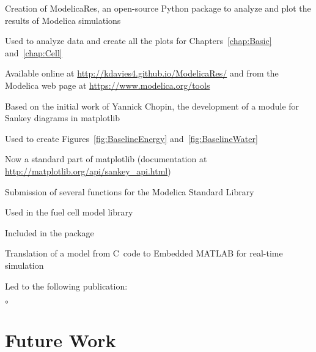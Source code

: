 \begin{itemize*}

  \item Creation of ModelicaRes, an open-source Python package to analyze and plot the results of Modelica simulations
    \begin{itemize*}
      \item Used to analyze data and create all the plots for Chapters~\ref{chap:Basic} and~\ref{chap:Cell}
      \item Available online at \url{http://kdavies4.github.io/ModelicaRes/} and from the Modelica web page at \url{https://www.modelica.org/tools}
    \end{itemize*}

  \item Based on the initial work of Yannick Chopin, the development of a module for Sankey diagrams in matplotlib
    \begin{itemize*}
      \item Used to create Figures~\ref{fig:BaselineEnergy} and~\ref{fig:BaselineWater}
      \item Now a standard part of matplotlib (documentation at \url{http://matplotlib.org/api/sankey_api.html})
    \end{itemize*}

  \item Submission of several functions for the Modelica Standard Library 
  \begin{itemize*}
    \item Used in the fuel cell model library
    \item Included in the  package
  \end{itemize*}

  \item Translation of a  model from C~code to Embedded MATLAB for real-time simulation
  \begin{itemize*}
    \item Led to the following publication:\\      \vspace{-4ex}
    \begin{itemize*}
      \item[$\circ$] 
    \end{itemize*}
  \end{itemize*}
\end{itemize*}


\section{Future Work}

